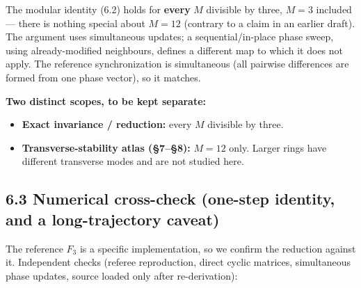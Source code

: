 \documentclass[
  11pt,
  a4paper,
]{article}
\providecommand{\tightlist}{%
  \setlength{\itemsep}{0pt}\setlength{\parskip}{0pt}}
\begin{document}
The modular identity (6.2) holds for \textbf{every} \(M\) divisible by three, \(M=3\) included --- there is nothing special about \(M=12\) (contrary to a claim in an earlier draft). The argument uses simultaneous updates; a sequential/in-place phase sweep, using already-modified neighbours, defines a different map to which it does not apply. The reference synchronization is simultaneous (all pairwise differences are formed from one phase vector), so it matches.

\textbf{Two distinct scopes, to be kept separate:}

\begin{itemize}
\tightlist
\item
  \textbf{Exact invariance / reduction:} every \(M\) divisible by three.
\item
  \textbf{Transverse-stability atlas (§7--§8):} \(M=12\) only. Larger rings have different transverse modes and are not studied here.
\end{itemize}

\subsection{6.3 Numerical cross-check (one-step identity, and a long-trajectory caveat)}\label{numerical-cross-check-one-step-identity-and-a-long-trajectory-caveat}

The reference \(F_3\) is a specific implementation, so we confirm the reduction against it. Independent checks (referee reproduction, direct cyclic matrices, simultaneous phase updates, source loaded only after re-derivation):

\begingroup\fontsize{9.3}{12}\selectfont\setlength{\tabcolsep}{4pt}\renewcommand{\arraystretch}{1.18}
\end{document}
